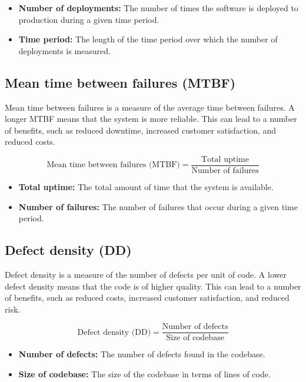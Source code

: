\documentclass[12pt, letterpaper]{article}
\begin{document}
\begin{itemize}
    \item \textbf{Number of deployments:} The number of times the software is deployed to production during a given time period.
    \item \textbf{Time period:} The length of the time period over which the number of deployments is measured.
\end{itemize}

\subsection{Mean time between failures (MTBF)}

Mean time between failures is a measure of the average time between failures. A longer MTBF means that the system is more reliable. This can lead to a number of benefits, such as reduced downtime, increased customer satisfaction, and reduced costs\cite{Rütz}.

\begin{equation}
\text{Mean time between failures (MTBF)} = \frac{\text{Total uptime}}{\text{Number of failures}}
\end{equation}

\begin{itemize}
    \item \textbf{Total uptime:} The total amount of time that the system is available.
    \item \textbf{Number of failures:} The number of failures that occur during a given time period.
\end{itemize}


\subsection{Defect density (DD)}
Defect density is a measure of the number of defects per unit of code. A lower defect density means that the code is of higher quality. This can lead to a number of benefits, such as reduced costs, increased customer satisfaction, and reduced risk\cite{FerreiraLeite}.

\begin{equation}
\text{Defect density (DD)} = \frac{\text{Number of defects}}{\text{Size of codebase}}
\end{equation}

\begin{itemize}
    \item \textbf{Number of defects:} The number of defects found in the codebase.
    \item \textbf{Size of codebase:} The size of the codebase in terms of lines of code.
\end{itemize}
\end{document}
